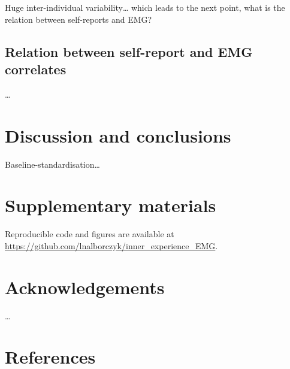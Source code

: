 \documentclass[
  english,
  man,floatsintext]{apa6}
\begin{document}
Huge inter-individual variability\ldots{} which leads to the next point, what is the relation between self-reports and EMG?

\hypertarget{relation-between-self-report-and-emg-correlates}{%
\subsection{Relation between self-report and EMG correlates}\label{relation-between-self-report-and-emg-correlates}}

\ldots{}

\hypertarget{discussion-and-conclusions}{%
\section{Discussion and conclusions}\label{discussion-and-conclusions}}

Baseline-standardisation\ldots{}

\hypertarget{supp}{%
\section{Supplementary materials}\label{supp}}

Reproducible code and figures are available at \url{https://github.com/lnalborczyk/inner_experience_EMG}.

\hypertarget{acknowledgements}{%
\section*{Acknowledgements}\label{acknowledgements}}

\ldots{}

\hypertarget{references}{%
\section*{References}\label{references}}
\end{document}
